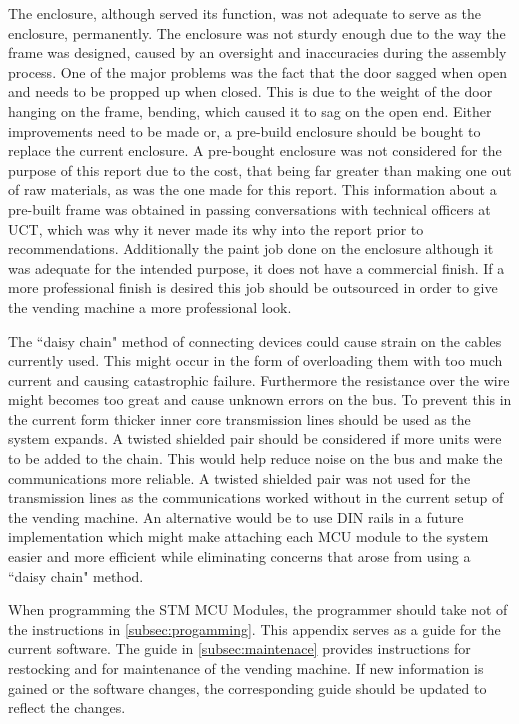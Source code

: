 \documentclass[a4paper,11pt]{article}
\numberwithin{figure}{section}
\numberwithin{table}{section}
\begin{document}
The enclosure, although served its function, was not adequate to serve as the enclosure, permanently. The enclosure was not sturdy enough due to the way the frame was designed, caused by an oversight and inaccuracies during the assembly process. One of the major problems was the fact that the door sagged when open and needs to be propped up when closed. This is due to the weight of the door hanging on the frame, bending, which caused it to sag on the open end. Either improvements need to be made or, a pre-build enclosure should be bought to replace the current enclosure. A pre-bought enclosure was not considered for the purpose of this report due to the cost, that being far greater than making one out of raw materials, as was the one made for this report. This information about a pre-built frame was obtained in passing conversations with technical officers at UCT, which was why it never made its why into the report prior to recommendations. Additionally the paint job done on the enclosure although it was adequate for the intended purpose, it does not have a commercial finish. If a more professional finish is desired this job should be outsourced in order to give the vending machine a more professional look.

The ``daisy chain" method of connecting devices could cause strain on the cables currently used. This might occur in the form of overloading them with too much current and causing catastrophic failure. Furthermore the resistance over the wire might becomes too great and cause unknown errors on the bus. To prevent this in the current form thicker inner core transmission lines should be used as the system expands. A twisted shielded pair should be considered if more units were to be added to the chain. This would help reduce noise on the bus and make the communications more reliable. A twisted shielded pair was not used for the transmission lines as the communications worked without in the current setup of the vending machine. An alternative would be to use DIN rails in a future implementation which might make attaching each MCU module to the system easier and more efficient while eliminating concerns that arose from using a ``daisy chain" method.

When programming the STM MCU Modules, the programmer should take not of the instructions in \autoref{subsec:progamming}. This appendix serves as a guide for the current software. The guide in \autoref{subsec:maintenace} provides instructions for restocking and for maintenance of the vending machine. If new information is gained or the software changes, the corresponding guide should be updated to reflect the changes.
\end{document}
